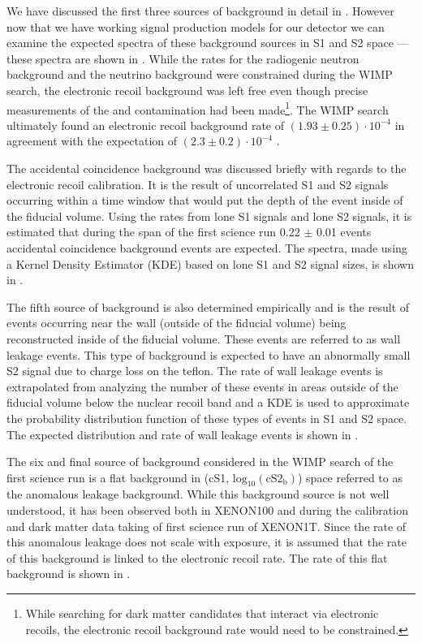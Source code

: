 We have discussed the first three sources of background in detail in .  However now that we have working signal production models for our detector we can examine the expected spectra of these background sources in S1 and S2 space --- these spectra are shown in .  While the rates for the radiogenic neutron background and the neutrino background were constrained during the WIMP search, the electronic recoil background was left free even though precise measurements of the \krypton{} and \radon{} contamination had been made\footnote{While searching for dark matter candidates that interact via electronic recoils, the electronic recoil background rate would need to be constrained.}.  The WIMP search ultimately found an electronic recoil background rate of $(1.93 \pm 0.25) \cdot 10^{-4}$ \dru{} in agreement with the expectation of $(2.3 \pm 0.2) \cdot 10^{-4}$ \dru{} \cite{aprile2017first}.

The accidental coincidence background was discussed briefly with regards to the electronic recoil calibration.  It is the result of uncorrelated S1 and S2 signals occurring within a time window that would put the depth of the event inside of the fiducial volume.    Using the rates from lone S1 signals and lone S2 signals, it is estimated that during the span of the first science run 0.22 $\pm$ 0.01 events accidental coincidence background events are expected.  The spectra, made using a Kernel Density Estimator (KDE) based on lone S1 and S2 signal sizes, is shown in .

The fifth source of background is also determined empirically and is the result of events occurring near the wall (outside of the fiducial volume) being reconstructed inside of the fiducial volume.  These events are referred to as wall leakage events.  This type of background is expected to have an abnormally small S2 signal due to charge loss on the teflon.  The rate of wall leakage events is extrapolated from analyzing the number of these events in areas outside of the fiducial volume below the nuclear recoil band and a KDE is used to approximate the probability distribution function of these types of events in S1 and S2 space.  The expected distribution and rate of wall leakage events is shown in .

The six and final source of background considered in the WIMP search of the first science run is a flat background in (cS1, $\textrm{log}_{10}(\textrm{cS2}_\textrm{b})$) space referred to as the anomalous leakage background.  While this background source is not well understood, it has been observed both in XENON100 \cite{aprile2016xenon100} and during the  calibration and dark matter data taking of first science run of XENON1T.  Since the rate of this anomalous leakage does not scale with exposure, it is assumed that the rate of this background is linked to the electronic recoil rate.  The rate of this flat background is shown in .

